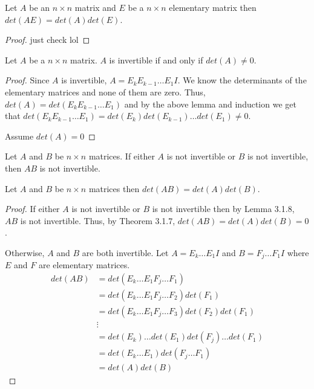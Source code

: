 \begin{lemma}
    Let $A$ be an $n\times n$ matrix and $E$ be a $n\times n$ elementary matrix then $det(AE)=det(A)det(E)$.
\end{lemma}
\begin{proof}
    just check lol
\end{proof}
\begin{theorem}
    Let $A$ be a $n\times n$ matrix. $A$ is invertible if and only if $det(A)\neq 0$.
\end{theorem}
\begin{proof}
    Since $A$ is invertible, $A=E_kE_{k-1}\ldots E_1 I$. We know the determinants of the elementary matrices and none of them are zero. Thus, $det(A)=det(E_k E_{k-1}\ldots E_1)$ and by the above lemma and induction we get that $det(E_k E_{k-1}\ldots E_1)=det(E_k)det(E_{k-1})\ldots det(E_1)\neq 0$.

    Assume $det(A)=0$
\end{proof}
\begin{lemma}
    Let $A$ and $B$ be $n\times n$ matrices. If either $A$ is not invertible or $B$ is not invertible, then $AB$ is not invertible.
\end{lemma}
\begin{theorem}
    Let $A$ and $B$ be $n\times n$ matrices then $det(AB)=det(A)det(B)$.
\end{theorem}
\begin{proof}
    If either $A$ is not invertible or $B$ is not invertible then by Lemma 3.1.8, $AB$ is not invertible. Thus, by Theorem 3.1.7, $det(AB)=det(A)det(B)=0$.

    Otherwise, $A$ and $B$ are both invertible. Let $A=E_k\ldots E_1I$ and $B=F_j\ldots F_1I$ where $E$ and $F$ are elementary matrices.
    \begin{align*}
        det(AB)&=det(E_k\ldots E_1 F_j\ldots F_1)\\
        &=det(E_k\ldots E_1F_j\ldots F_2)det(F_1)\tag{by Lemma 18.6}\\
        &=det(E_k\ldots E_1F_j\ldots F_3)det(F_2)det(F_1)\tag{by Lemma 18.6}\\
        &\vdots\\
        &=det(E_k)\ldots det(E_1)det(F_j)\ldots det(F_1)\\
        &=det(E_k\ldots E_1)det(F_j\ldots F_1)\\
        &=det(A)det(B)
    \end{align*}
\end{proof}

